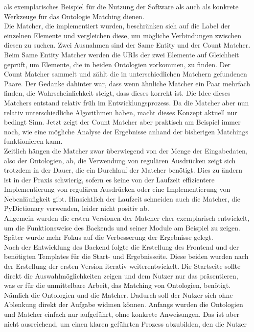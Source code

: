 als exemplarisches Beispiel für die Nutzung der Software als auch als konkrete
Werkzeuge für das Ontologie Matching dienen.\\
Die Matcher, die implementiert wurden, beschränken sich auf die Label der
einzelnen Elemente und vergleichen diese, um mögliche Verbindungen zwischen
diesen zu suchen. Zwei Ausnahmen sind der Same Entity und der Count Matcher.
Beim Same Entity Matcher werden die URIs der zwei Elemente auf Gleichheit
geprüft, um Elemente, die in beiden Ontologien vorkommen, zu finden. Der Count
Matcher sammelt und zählt die in unterschiedlichen Matchern gefundenen Paare. 
Der Gedanke dahinter war, dass wenn ähnliche Matcher ein Paar mehrfach finden,
die Wahrscheinlichkeit steigt, dass dieses korrekt ist. Die Idee dieses
Matchers entstand relativ früh im Entwicklungsprozess. Da die Matcher aber nun
relativ unterschiedliche Algorithmen haben, macht dieses Konzept aktuell nur
bedingt Sinn. Jetzt zeigt der Count Matcher aber praktisch am Beispiel immer
noch, wie eine mögliche Analyse der Ergebnisse anhand der bisherigen Matchings funktionieren kann.\\
Zeitlich hängen die Matcher zwar überwiegend von der Menge
der Eingabedaten, also der Ontologien, ab, die Verwendung von regulären Ausdrücken
zeigt sich trotzdem in der Dauer, die ein Durchlauf der Matcher benötigt. Dies
zu ändern ist in der Praxis schwierig, sofern es keine von der Laufzeit
effizientere Implementierung von regulären Ausdrücken oder eine Implementierung
von Nebenläufigkeit gibt.
Hinsichtlich der Laufzeit
schneiden auch die Matcher, die PyDictionary verwenden, leider nicht
positiv ab.\\
Allgemein wurden die ersten Versionen der Matcher eher exemplarisch
entwickelt, um die Funktionsweise des Backends und seiner Module am Beispiel zu
zeigen. Später wurde mehr Fokus auf die Verbesserung der Ergebnisse gelegt.\\
Nach der Entwicklung des Backend folgte die Erstellung des Frontend und der
benötigten Templates für die Start- und Ergebnisseite. Diese beiden wurden nach
der Erstellung der ersten Version iterativ weiterentwickelt. Die Startseite
sollte direkt die Auswahlmöglichkeiten zeigen und dem Nutzer nur das
präsentieren, was er für die unmittelbare Arbeit, das Matching von Ontologien,
benötigt. Nämlich die Ontologien und die Matcher. Dadurch soll der Nutzer sich
ohne Ablenkung direkt der Aufgabe widmen können. Anfangs wurden die Ontologien
und Matcher einfach nur aufgeführt, ohne konkrete Anweisungen. Das ist aber
nicht ausreichend, um einen klaren geführten Prozess abzubilden, den die Nutzer
